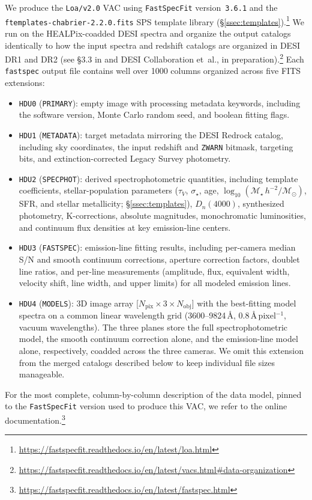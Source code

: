 \documentclass[modern,linenumbers]{aastex702}
\newcommand{\fastspecfit}{\texttt{FastSpecFit}}
\newcommand{\fastspec}{\texttt{fastspec}}
\newcommand{\vdisp}{\ensuremath{\sigma_\star}}
\newcommand{\Mstar}{\ensuremath{\mathcal{M}_{\star}}}
\newcommand{\msun}{\ensuremath{\mathcal{M}_{\odot}}}
\newcommand{\logmstar}{\ensuremath{\log_{10}(\Mstar\,h^{-2}/\msun)}}
\begin{document}
We produce the \texttt{Loa/v2.0} VAC using \fastspecfit{}
version~\texttt{3.6.1} and the \texttt{ftemplates-chabrier-2.2.0.fits}
SPS template library
(\S\ref{ssec:templates}).\footnote{\url{https://fastspecfit.readthedocs.io/en/latest/loa.html}}
We run on the HEALPix-coadded DESI spectra and organize the output
catalogs identically to how the input spectra and redshift catalogs
are organized in DESI DR1 and DR2 (see \S3.3 in
\citealt{desi-collaboration26a} and DESI Collaboration et~al., in
preparation).\footnote{\url{https://fastspecfit.readthedocs.io/en/latest/vacs.html\#data-organization}}
Each \fastspec{} output file contains well over 1000 columns organized
across five FITS extensions:
\begin{itemize}
  \item \texttt{HDU0} (\texttt{PRIMARY}): empty image with processing
    metadata keywords, including the software version, Monte Carlo
    random seed, and boolean fitting flags.
  \item \texttt{HDU1} (\texttt{METADATA}): target metadata mirroring
    the DESI Redrock catalog, including sky coordinates, the input
    redshift and \texttt{ZWARN} bitmask, targeting bits, and
    extinction-corrected Legacy Survey photometry.
  \item \texttt{HDU2} (\texttt{SPECPHOT}): derived spectrophotometric
    quantities, including template coefficients, stellar-population
    parameters ($\tau_V$, $\vdisp$, age, $\logmstar$, SFR, and stellar
    metallicity; \S\ref{ssec:templates}), $D_n(4000)$, synthesized
    photometry, K-corrections, absolute magnitudes, monochromatic
    luminosities, and continuum flux densities at key emission-line
    centers.
  \item \texttt{HDU3} (\texttt{FASTSPEC}): emission-line fitting
    results, including per-camera median S/N and smooth continuum
    corrections, aperture correction factors, doublet line ratios, and
    per-line measurements (amplitude, flux, equivalent width, velocity
    shift, line width, and upper limits) for all modeled emission
    lines.
  \item \texttt{HDU4} (\texttt{MODELS}): 3D image array
    [$N_\mathrm{pix} \times 3 \times N_\mathrm{obj}$] with the
    best-fitting model spectra on a common linear wavelength grid
    (3600--9824\,\AA, $0.8$\,\AA\,pixel$^{-1}$, vacuum
    wavelengths). The three planes store the full spectrophotometric
    model, the smooth continuum correction alone, and the
    emission-line model alone, respectively, coadded across the three
    cameras. We omit this extension from the merged catalogs described
    below to keep individual file sizes manageable.
\end{itemize}
\noindent For the most complete, column-by-column description of the
data model, pinned to the \fastspecfit{} version used to produce this
VAC, we refer to the online
documentation.\footnote{\url{https://fastspecfit.readthedocs.io/en/latest/fastspec.html}}
\end{document}
